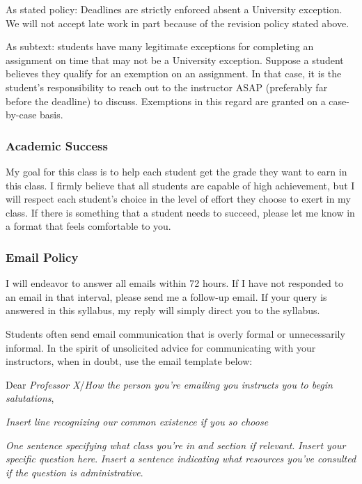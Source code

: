 \documentclass[
  11pt,
]{article}
\begin{document}
As stated policy: Deadlines are strictly enforced absent a University
exception. We will not accept late work in part because of the revision
policy stated above.

As subtext: students have many legitimate exceptions for completing an
assignment on time that may not be a University exception. Suppose a
student believes they qualify for an exemption on an assignment. In that
case, it is the student's responsibility to reach out to the instructor
ASAP (preferably far before the deadline) to discuss. Exemptions in this
regard are granted on a case-by-case basis.

\hypertarget{academic-success}{%
\subsubsection{Academic Success}\label{academic-success}}

My goal for this class is to help each student get the grade they want
to earn in this class. I firmly believe that all students are capable of
high achievement, but I will respect each student's choice in the level
of effort they choose to exert in my class. If there is something that a
student needs to succeed, please let me know in a format that feels
comfortable to you.

\hypertarget{email-policy}{%
\subsubsection{Email Policy}\label{email-policy}}

I will endeavor to answer all emails within 72 hours. If I have not
responded to an email in that interval, please send me a follow-up
email. If your query is answered in this syllabus, my reply will simply
direct you to the syllabus.

Students often send email communication that is overly formal or
unnecessarily informal. In the spirit of unsolicited advice for
communicating with your instructors, when in doubt, use the email
template below:

Dear \emph{Professor X}/\emph{How the person you're emailing you
instructs you to begin salutations},

\emph{Insert line recognizing our common existence if you so choose}

\emph{One sentence specifying what class you're in and section if
relevant}. \emph{Insert your specific question here}. \emph{Insert a
sentence indicating what resources you've consulted if the question is
administrative}.
\end{document}
